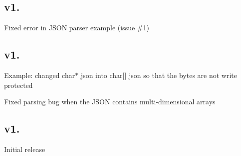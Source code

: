 \subsection*{v1. }


\begin{DoxyItemize}
\item Fixed error in J\+S\+O\+N parser example (issue \#1)
\end{DoxyItemize}

\subsection*{v1. }


\begin{DoxyItemize}
\item Example\+: changed {\ttfamily char$\ast$ json} into {\ttfamily char\mbox{[}\mbox{]} json} so that the bytes are not write protected
\item Fixed parsing bug when the J\+S\+O\+N contains multi-\/dimensional arrays
\end{DoxyItemize}

\subsection*{v1. }

Initial release 